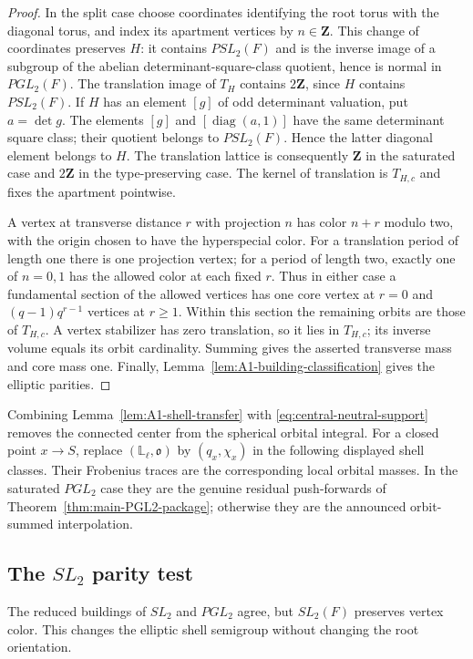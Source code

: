 \documentclass[11pt]{article}
\theoremstyle{definition}
\theoremstyle{remark}
\newcommand{\Lell}{\mathbb L_{\ell}}
\begin{document}
\begin{proof}
In the split case choose coordinates identifying the root torus with the
diagonal torus, and index its apartment vertices by $n\in\mathbf Z$.
This change of coordinates preserves $H$: it contains $PSL_2(F)$ and
is the inverse image of a subgroup of the abelian determinant-square-class
quotient, hence is normal in $PGL_2(F)$.
The translation image of $T_H$ contains $2\mathbf Z$, since
$H$ contains $PSL_2(F)$.  If $H$ has an element $[g]$ of odd determinant
valuation, put $a=\det g$.  The elements $[g]$ and
$[\operatorname{diag}(a,1)]$ have the same determinant square class;
their quotient belongs to $PSL_2(F)$.  Hence the latter diagonal element
belongs to $H$.  The translation lattice is consequently $\mathbf Z$
in the saturated case and $2\mathbf Z$ in the type-preserving case.
The kernel of translation is $T_{H,c}$ and fixes the apartment pointwise.

A vertex at transverse distance $r$ with projection $n$ has color
$n+r$ modulo two, with the origin chosen to have the hyperspecial color.
For a translation period of length one there is one projection vertex;
for a period of length two, exactly one of $n=0,1$ has the allowed color
at each fixed $r$.  Thus in either case a fundamental section of the
allowed vertices has one core vertex at $r=0$ and
$(q-1)q^{r-1}$ vertices at $r\geq1$.  Within this section the remaining
orbits are those of $T_{H,c}$.  A vertex stabilizer has zero translation,
so it lies in $T_{H,c}$; its inverse volume equals its orbit cardinality.
Summing gives the asserted transverse mass and core mass one.  Finally,
Lemma~\ref{lem:A1-building-classification} gives the elliptic parities.
\end{proof}

Combining Lemma~\ref{lem:A1-shell-transfer} with
\eqref{eq:central-neutral-support} removes the connected center from the
spherical orbital integral.  For a closed point $x\to S$, replace
$(\Lell,\mathfrak o)$ by $(q_x,\chi_x)$ in the following displayed shell
classes.  Their Frobenius traces are the corresponding local orbital masses.
In the saturated $PGL_2$ case they are the genuine residual push-forwards of
Theorem~\ref{thm:main-PGL2-package}; otherwise they are the announced orbit-summed interpolation.

\subsection{The \texorpdfstring{$SL_2$}{SL2} parity test}

The reduced buildings of $SL_2$ and $PGL_2$ agree, but $SL_2(F)$ preserves
vertex color.  This changes the elliptic shell semigroup without changing
the root orientation.
\end{document}
